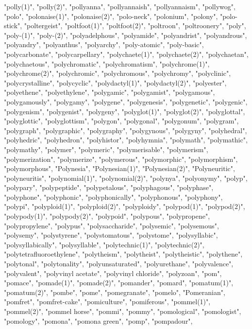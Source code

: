 "polly(1)",
"polly(2)",
"pollyanna",
"pollyannaish",
"pollyannaism",
"pollywog",
"polo",
"polonaise(1)",
"polonaise(2)",
"polo-neck",
"polonium",
"polony",
"polo-stick",
"poltergeist",
"poltfoot(1)",
"poltfoot(2)",
"poltroon",
"poltroonery",
"poly",
"poly-(1)",
"poly-(2)",
"polyadelphous",
"polyamide",
"polyandrist",
"polyandrous",
"polyandry",
"polyanthus",
"polyarchy",
"poly-atomic",
"poly-basic",
"polycarbonate",
"polycarpellary",
"polychaete(1)",
"polychaete(2)",
"polychaetan",
"polychaetous",
"polychromatic",
"polychromatism",
"polychrome(1)",
"polychrome(2)",
"polychromic",
"polychromous",
"polychromy",
"polyclinic",
"polycrystalline",
"polycyclic",
"polydactyl(1)",
"polydactyl(2)",
"polyester",
"polyethene",
"polyethylene",
"polygamic",
"polygamist",
"polygamous",
"polygamously",
"polygamy",
"polygene",
"polygenesis",
"polygenetic",
"polygenic",
"polygenism",
"polygenist",
"polygeny",
"polyglot(1)",
"polyglot(2)",
"polyglottal",
"polyglottic",
"polyglottism",
"polygon",
"polygonal",
"polygonum",
"polygram",
"polygraph",
"polygraphic",
"polygraphy",
"polygynous",
"polygyny",
"polyhedral",
"polyhedric",
"polyhedron",
"polyhistor",
"polyhymnia",
"polymath",
"polymathic",
"polymathy",
"polymer",
"polymeric",
"polymerisable",
"polymerism",
"polymerization",
"polymerize",
"polymerous",
"polymorphic",
"polymorphism",
"polymorphous",
"Polynesia",
"Polynesian(1)",
"Polynesian(2)",
"Polyneuritic",
"polyneuritis",
"polynomial(1)",
"polynomial(2)",
"polynya",
"polyonymy",
"polyp",
"polypary",
"polypeptide",
"polypetalous",
"polyphagous",
"polyphase",
"polyphone",
"polyphonic",
"polyphonically",
"polyphonous",
"polyphony",
"polypi",
"polyploid(1)",
"polyploid(2)",
"polyploidy",
"polypod(1)",
"polypod(2)",
"polypody(1)",
"polypody(2)",
"polypoid",
"polypous",
"polypropene",
"polypropylene",
"polypus",
"polysaccharide",
"polysemic",
"polysemous",
"polysemy",
"polystyrene",
"polystomatous",
"polystome",
"polysyllabic",
"polysyllabically",
"polysyllable",
"polytechnic(1)",
"polytechnic(2)",
"polytetrafluoroethylene",
"polytheism",
"polytheist",
"polytheistic",
"polythene",
"polytonal",
"polytonality",
"polyunsaturated",
"polyurethane",
"polyvalence",
"polyvalent",
"polyvinyl acetate",
"polyvinyl chloride",
"polyzoan",
"pom",
"pomace",
"pomade(1)",
"pomade(2)",
"pomander",
"pomard",
"pomatum(1)",
"pomatum(2)",
"pombe",
"pome",
"pomegranate",
"pomelo",
"Pomeranian",
"pomfret",
"pomfret-cake",
"pomiculture",
"pomiferous",
"pommel(1)",
"pommel(2)",
"pommel horse",
"pommi",
"pommy",
"pomological",
"pomologist",
"pomology",
"pomona",
"pomona green",
"pomp",
"pompadour",
